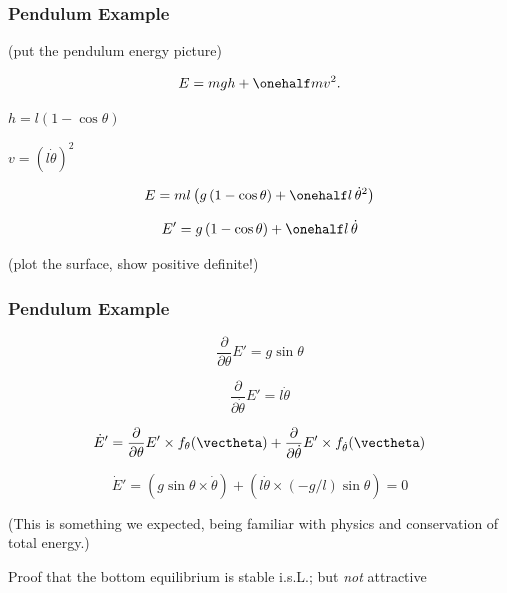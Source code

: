 \documentclass[12pt]{beamer}
\begin{document}
\begin{frame}
\frametitle{Pendulum Example}

(put the pendulum energy picture)

\[
E = mgh + \onehalf m v^2.
\]

$h = l(1-\cos\theta)$

$v = (l\dot\theta)^2$

\[
E
	= ml \left( g \, (1-\cos\theta) + \onehalf l \, \dot\theta^2 \right)
\]

\[
E' = g \, (1-\cos\theta) + \onehalf l \, \dot\theta
\]

(plot the surface, show positive definite!)

\end{frame}



\begin{frame}
\frametitle{Pendulum Example}
\[
\frac{\partial}{\partial\theta} E' = g \sin \theta
\]

\[
\frac{\partial}{\partial\dot\theta} E' = l \dot\theta
\]

\[
\dot E' =
	\frac{\partial}{\partial\theta} E' 
		\times f_{\theta}(\vectheta)
	+ \frac{\partial}{\partial\dot\theta} E'
		\times f_{\dot\theta}(\vectheta)
\]


\[
\dot E' =
	\left( g \sin\theta \times \dot\theta \right)
	+ \left( l \dot\theta \times (-g/l) \sin \theta \right) = 0
\]

(This is something we expected, being familiar with physics and conservation of total energy.)

Proof that the bottom equilibrium is stable i.s.L.; but \emph{not} attractive

\end{frame}
\end{document}
